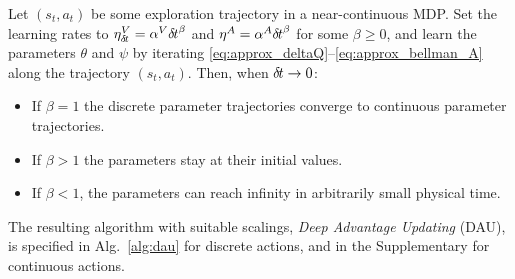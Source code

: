 
\begin{theorem}
	\label{th:cont-params}
Let $(s_t,a_t)$ be some exploration trajectory in a near-continuous MDP. Set the learning rates to $\eta^V_{\delta\hspace{-.1em}t} =
\alpha^V {\delta\hspace{-.1em}t}^\beta$ and $\eta^A = \alpha^A {\delta\hspace{-.1em}t}^\beta$ for some
$\beta\geq 0$, and learn the parameters $\theta$ and $\psi$ by iterating
\eqref{eq:approx_deltaQ}--\eqref{eq:approx_bellman_A} along the
trajectory $(s_t,a_t)$. Then, when
${\delta\hspace{-.1em}t}\to 0$:
	\begin{itemize}
		\item If $\beta = 1$ the discrete parameter trajectories converge to continuous parameter
			trajectories.%
		\item If $\beta>1$ the parameters stay at their initial
		values.
		\item If $\beta < 1$, the parameters can reach infinity
		in arbitrarily small physical time.%
	\end{itemize}
\end{theorem}


The resulting algorithm with suitable scalings,
\emph{Deep Advantage Updating} (DAU), is specified in Alg.~\ref{alg:dau} for
discrete actions, and in the Supplementary for continuous
actions.

